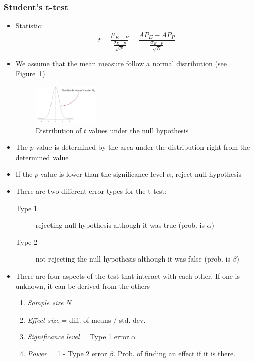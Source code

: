 \subsubsection{Student's t-test}
\begin{itemize}
	\item Statistic: $$t=\frac{\mu_{E-P}}{\frac{\sigma_{E-P}}{\sqrt{N}}} = \frac{\overline{AP_E - AP_P}}{\frac{\sigma_{E-P}}{\sqrt{N}}}$$
	\item We assume that the mean measure follow a normal distribution (see Figure~\ref{img:hypothesis_testing_t_test_t_dist})
	\begin{figure}[ht]
		\centering
		\includegraphics[width=0.3\textwidth]{figures/hypothesis_testing_t_test_t_dist.png}
		\caption{Distribution of $t$ values under the null hypothesis}
		\label{img:hypothesis_testing_t_test_t_dist}
	\end{figure}
	\item The $p$-value is determined by the area under the distribution right from the determined value
	\item If the $p$-value is lower than the significance level $\alpha$, reject null hypothesis
	\item There are two different error types for the t-test: 
	\begin{description}
		\item[Type 1] rejecting null hypothesis although it was true (prob. is $\alpha$)
		\item[Type 2] not rejecting the null hypothesis although it was false (prob. is $\beta$)
	\end{description}
	\item There are four aspects of the test that interact with each other. If one is unknown, it can be derived from the others
	\begin{enumerate}
		\item \textit{Sample size} $N$
		\item \textit{Effect size} = diff. of means / std. dev.
		\item \textit{Significance level} = Type 1 error $\alpha$
		\item \textit{Power} = 1 - Type 2 error $\beta$. Prob. of finding an effect if it is there. 
	\end{enumerate}
\end{itemize}
